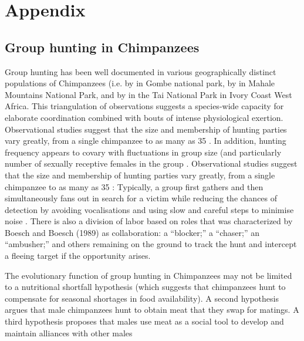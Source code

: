 \chapter{\label{app1:intro}Appendix}












\section{Group hunting in Chimpanzees\label{sect:groupHunt}}
Group hunting has been well documented in various geographically distinct populations of Chimpanzees (i.e. by \textcite{Goodall1986}  in Gombe national park, by \textcite{Uehara1997} in Mahale Mountains National Park, and by \textcite{Boesch1989, Boesch1994} in the Tai National Park in Ivory Coast West Africa.  This triangulation of observations suggests a species-wide capacity for elaborate coordination combined with bouts of intense physiological exertion.   Observational studies suggest that the size and membership of hunting parties vary greatly, from a single chimpanzee to as many as 35 \citep{Stanford1994}.   In addition, hunting frequency appears to covary with fluctuations in group size (and particularly number of sexually receptive females in the group \citep{Stanford1996}.
Observational studies suggest that the size and membership of hunting parties vary greatly, from a single chimpanzee to as many as 35 \citep{Stanford1994}: Typically, a group first gathers and then simultaneously fans out in search for a victim while reducing the chances of detection by avoiding vocalisations and using slow and careful steps to minimise noise \citep{Boesch1989,Mitani2001}.  There is also a division of labor based on roles that was characterized by Boesch and Boesch (1989) as collaboration: a ``blocker;'' a ``chaser;'' an ``ambusher;'' and others remaining on the ground to track the hunt and intercept a fleeing target if the opportunity arises.

The evolutionary function of group hunting in Chimpanzees may not be limited to a nutritional shortfall hypothesis (which suggests that chimpanzees hunt to compensate for seasonal shortages in food availability).  A second hypothesis argues that male chimpanzees hunt to obtain meat that they swap for matings. A third hypothesis proposes that males use meat as a social tool to develop and maintain alliances with other males \citep{Mitani2001}



